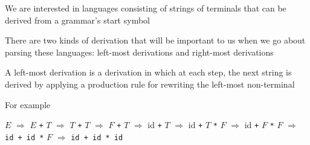 \documentclass[8pt,a4paper,compress]{beamer}
\newcommand{\mm}[1]{$#1$}
\newenvironment{spaced}
{
\smallskip
\hspace{.5cm}
\begin{minipage}[c]{\textwidth}
}
{
\end{minipage}
\smallskip
}
\begin{document}
\begin{frame}[fragile]
\pause

We are interested in languages consisting of strings of terminals that can be derived from a grammar's start symbol

\pause
\bigskip

There are two kinds of derivation that will be important to us when we go about parsing these languages: left-most derivations and right-most derivations

\pause
\bigskip

A left-most derivation is a derivation in which at each step, the next string is derived by applying a production rule for rewriting the left-most non-terminal

\pause
\bigskip

For example

\text{ }
\begin{spaced}
\begin{production}
\underline{\mm{E}} \mm{\Rightarrow} \underline{\mm{E}} \lstinline{+} \mm{T}
   \mm{\Rightarrow} \underline{\mm{T}} \lstinline{+} \mm{T}
   \mm{\Rightarrow} \underline{\mm{F}} \lstinline{+} \mm{T}
   \mm{\Rightarrow} id \lstinline{+} \underline{\mm{T}}
   \mm{\Rightarrow} id \lstinline{+} \underline{\mm{T}} \lstinline{*} \mm{F}
   \mm{\Rightarrow} id \lstinline{+} \underline{\mm{F}} \lstinline{*} \mm{F}
   \mm{\Rightarrow} \lstinline{id + id *} \underline{\mm{F}}
   \mm{\Rightarrow} \lstinline{id + id * id}
\end{production}
\end{spaced}
\end{frame}
\end{document}
